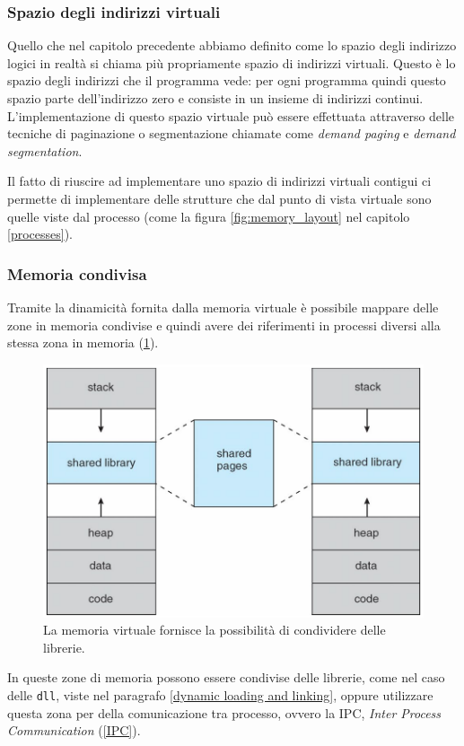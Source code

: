 % 
\subsubsection{Spazio degli indirizzi virtuali}
Quello che nel capitolo precedente abbiamo definito come lo spazio degli indirizzo logici in realtà si chiama più propriamente spazio di indirizzi virtuali. Questo è lo spazio degli indirizzi che il programma vede: per ogni programma quindi questo spazio parte dell'indirizzo zero e consiste in un insieme di indirizzi continui. L'implementazione di questo spazio virtuale può essere effettuata attraverso delle tecniche di paginazione o segmentazione chiamate come \textit{demand paging} e \textit{demand segmentation}. 

Il fatto di riuscire ad implementare uno spazio di indirizzi virtuali contigui ci permette di implementare delle strutture che dal punto di vista virtuale sono quelle viste dal processo (come la figura \ref{fig:memory_layout} nel capitolo \ref{processes}).

% 
\subsubsection{Memoria condivisa}
Tramite la dinamicità fornita dalla memoria virtuale è possibile mappare delle zone in memoria condivise e quindi avere dei riferimenti in processi diversi alla stessa zona in memoria (\ref{fig:shared_pages}). 
\begin{figure}[h]
    \centering
    \includegraphics[width = .4\textwidth]{../res/imgs/virtual memory/shared_pages.png}
    \caption{La memoria virtuale fornisce la possibilità di condividere delle librerie.}
    \label{fig:shared_pages}
\end{figure}
In queste zone di memoria possono essere condivise delle librerie, come nel caso delle \texttt{dll}, viste nel paragrafo \ref{dynamic loading and linking}, oppure utilizzare questa zona per della comunicazione tra processo, ovvero la IPC, \textit{Inter Process Communication} (\ref{IPC}).

% 
